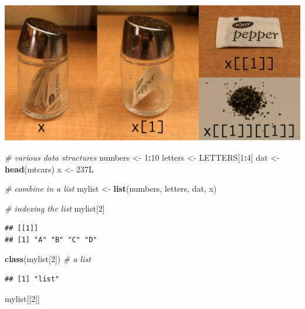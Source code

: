 \documentclass[]{book}
\newenvironment{Shaded}{\begin{snugshade}}{\end{snugshade}}
\newcommand{\CommentTok}[1]{\textcolor[rgb]{0.56,0.35,0.01}{\textit{#1}}}
\newcommand{\DecValTok}[1]{\textcolor[rgb]{0.00,0.00,0.81}{#1}}
\newcommand{\KeywordTok}[1]{\textcolor[rgb]{0.13,0.29,0.53}{\textbf{#1}}}
\newcommand{\NormalTok}[1]{#1}
\newcommand{\OperatorTok}[1]{\textcolor[rgb]{0.81,0.36,0.00}{\textbf{#1}}}
\newcommand{\StringTok}[1]{\textcolor[rgb]{0.31,0.60,0.02}{#1}}
\begin{document}
\includegraphics{R/RDataWrangling/images/indexing_lists.png}

\begin{Shaded}
\begin{Highlighting}[]
\CommentTok{# various data structures}
\NormalTok{numbers <-}\StringTok{ }\DecValTok{1}\OperatorTok{:}\DecValTok{10}
\NormalTok{letters <-}\StringTok{ }\NormalTok{LETTERS[}\DecValTok{1}\OperatorTok{:}\DecValTok{4}\NormalTok{]}
\NormalTok{dat <-}\StringTok{ }\KeywordTok{head}\NormalTok{(mtcars)}
\NormalTok{x <-}\StringTok{ }\NormalTok{237L}

\CommentTok{# combine in a list}
\NormalTok{mylist <-}\StringTok{ }\KeywordTok{list}\NormalTok{(numbers, letters, dat, x)}

\CommentTok{# indexing the list}
\NormalTok{mylist[}\DecValTok{2}\NormalTok{]}
\end{Highlighting}
\end{Shaded}

\begin{verbatim}
## [[1]]
## [1] "A" "B" "C" "D"
\end{verbatim}

\begin{Shaded}
\begin{Highlighting}[]
\KeywordTok{class}\NormalTok{(mylist[}\DecValTok{2}\NormalTok{]) }\CommentTok{# a list}
\end{Highlighting}
\end{Shaded}

\begin{verbatim}
## [1] "list"
\end{verbatim}

\begin{Shaded}
\begin{Highlighting}[]
\NormalTok{mylist[[}\DecValTok{2}\NormalTok{]]}
\end{Highlighting}
\end{Shaded}
\end{document}
